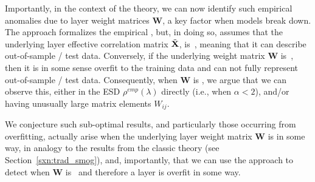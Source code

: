 Importantly, in the context of the \SETOL theory, we can now identify such empirical anomalies
due to \ATypical layer weight matrices $\mathbf{W}$, a key factor when models break down.
The \SETOL approach formalizes the empirical \HTSR \Phenomenology,
but, in doing so, assumes that the
underlying layer effective correlation matrix $\tilde{\mathbf{X}}$, is~\Typical, meaning that it can describe out-of-sample / test data.
Conversely, if the underlying weight matrix $\mathbf{W}$ is~\ATypical, then it is in some sense
overfit to the  training data and can not fully represent out-of-sample / test data.
Consequently, when $\mathbf{W}$ is \ATypical,  we argue that we can observe this, either in the ESD $\rho^{emp}(\lambda)$ directly
(i.e., when $\alpha< 2$),
and/or having unusually large matrix elements $W_{ij}$.

We conjecture such sub-optimal results, and particularly those occurring from overfitting, actually
arise when the underlying layer weight matrix $\mathbf{W}$ is \ATypical in some way,
in analogy to the results from the classic \SMOG theory (see Section~\ref{sxn:trad_smog}),
and, importantly, that we can use the \SETOL approach to detect when $\mathbf{W}$ is~\ATypical
and therefore a layer is overfit in some way.


